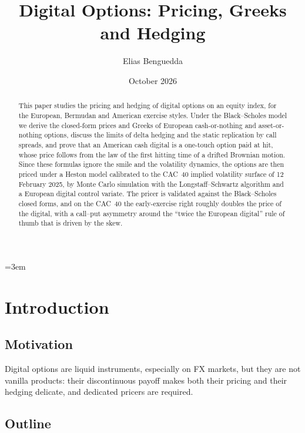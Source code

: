 \documentclass[11pt,a4paper]{article}
\title{Digital Options: Pricing, Greeks and Hedging}
\author{Elias Benguedda}
\date{October 2026}
\theoremstyle{remark}
\begin{document}
\emergencystretch=3em
\maketitle

\begin{abstract}
This paper studies the pricing and hedging of digital options on an equity
index, for the European, Bermudan and American exercise styles. Under the
Black--Scholes model we derive the closed-form prices and Greeks of European
cash-or-nothing and asset-or-nothing options, discuss the limits of delta
hedging and the static replication by call spreads, and prove that an American
cash digital is a one-touch option paid at hit, whose price follows from the
law of the first hitting time of a drifted Brownian motion. Since these
formulas ignore the smile and the volatility dynamics, the options are then
priced under a Heston model calibrated to the CAC~40 implied volatility surface
of 12 February 2025, by Monte Carlo simulation with the Longstaff--Schwartz
algorithm and a European digital control variate. The pricer is validated
against the Black--Scholes closed forms, and on the CAC~40 the early-exercise
right roughly doubles the price of the digital, with a call--put asymmetry
around the ``twice the European digital'' rule of thumb that is driven by the
skew.
\end{abstract}

\clearpage
\tableofcontents
\newpage

\section{Introduction}
\label{sec:intro}

\subsection{Motivation}

Digital options are liquid instruments, especially on FX markets, but they are
not vanilla products: their discontinuous payoff makes both their pricing and
their hedging delicate, and dedicated pricers are required.

\subsection{Outline}
\end{document}
